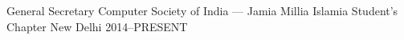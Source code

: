 
\begin{cvhonours}

\cvhonour%
  {General Secretary} %
  {Computer Society of India --- Jamia Millia Islamia Student's Chapter} %
  {New Delhi} %
  {2014--PRESENT} %

\end{cvhonours}
